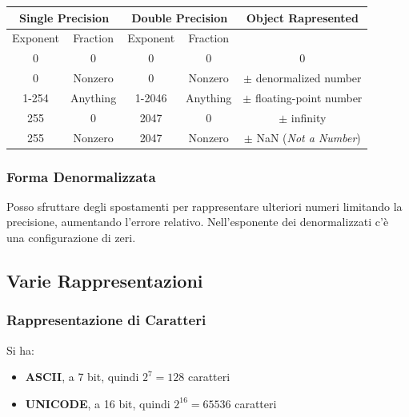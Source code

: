 \documentclass[a4paper,12pt, oneside]{book}
\begin{document}
\begin{center}
  \begin{tabular}{c|c|c|c|c}
    \multicolumn{2}{c}{Single Precision} & \multicolumn{2}{c}{Double Precision} & Object Rapresented                                                \\ \hline
    Exponent                             & Fraction                             & Exponent           & Fraction                                     \\ \hline
    0                                    & 0                                    & 0                  & 0        & 0                                 \\ \hline
    0                                    & Nonzero                              & 0                  & Nonzero  & $\pm$ denormalized number         \\ \hline
    1-254                                & Anything                             & 1-2046             & Anything & $\pm$ floating-point number       \\ \hline
    255                                  & 0                                    & 2047               & 0        & $\pm$ infinity                    \\ \hline
    255                                  & Nonzero                              & 2047               & Nonzero  & $\pm$ NaN (\textit{Not a Number}) \\ \hline
  \end{tabular}
\end{center}
\subsubsection{Forma Denormalizzata}
Posso sfruttare degli spostamenti per rappresentare ulteriori numeri limitando la precisione, aumentando l'errore relativo. Nell'esponente dei denormalizzati c'è una configurazione di zeri.
\subsection{Varie Rappresentazioni}
\subsubsection{Rappresentazione di Caratteri}
Si ha:
\begin{itemize}
  \item \textbf{ASCII}, a 7 bit, quindi $2^7=128$ caratteri
  \item \textbf{UNICODE}, a 16 bit, quindi $2^{16}=65536$ caratteri
\end{itemize}
\end{document}
